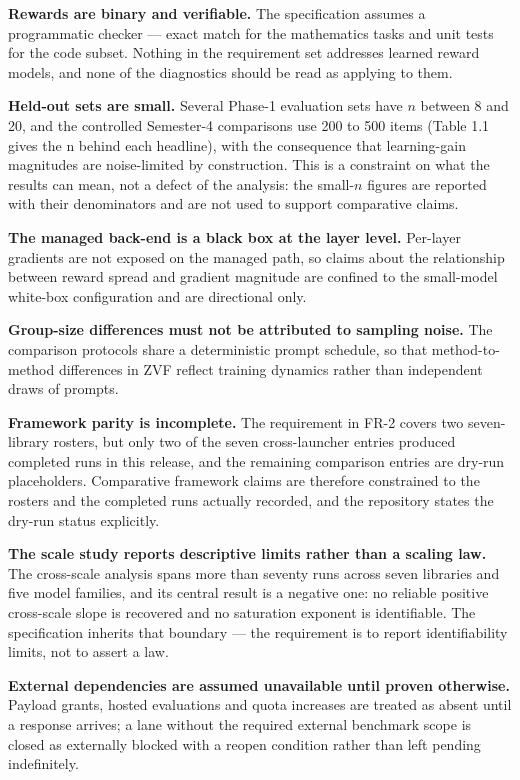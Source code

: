 \documentclass[12pt,a4paper]{report}
\begin{document}
\textbf{Rewards are binary and verifiable.} The specification assumes a
programmatic checker --- exact match for the mathematics tasks and unit
tests for the code subset. Nothing in the requirement set addresses
learned reward models, and none of the diagnostics should be read as
applying to them.

\textbf{Held-out sets are small.} Several Phase-1 evaluation sets have
\(n\) between 8 and 20, and the controlled Semester-4 comparisons use
200 to 500 items (Table 1.1 gives the n behind each headline), with the
consequence that learning-gain magnitudes are noise-limited by
construction. This is a constraint on what the results can mean, not a
defect of the analysis: the small-\(n\) figures are reported with their
denominators and are not used to support comparative claims.

\textbf{The managed back-end is a black box at the layer level.}
Per-layer gradients are not exposed on the managed path, so claims about
the relationship between reward spread and gradient magnitude are
confined to the small-model white-box configuration and are directional
only.

\textbf{Group-size differences must not be attributed to sampling
noise.} The comparison protocols share a deterministic prompt schedule,
so that method-to-method differences in ZVF reflect training dynamics
rather than independent draws of prompts.

\textbf{Framework parity is incomplete.} The requirement in FR-2 covers
two seven-library rosters, but only two of the seven cross-launcher
entries produced completed runs in this release, and the remaining
comparison entries are dry-run placeholders. Comparative framework
claims are therefore constrained to the rosters and the completed runs
actually recorded, and the repository states the dry-run status
explicitly.

\textbf{The scale study reports descriptive limits rather than a scaling
law.} The cross-scale analysis spans more than seventy runs across seven
libraries and five model families, and its central result is a negative
one: no reliable positive cross-scale slope is recovered and no
saturation exponent is identifiable. The specification inherits that
boundary --- the requirement is to report identifiability limits, not to
assert a law.

\textbf{External dependencies are assumed unavailable until proven
otherwise.} Payload grants, hosted evaluations and quota increases are
treated as absent until a response arrives; a lane without the required
external benchmark scope is closed as externally blocked with a reopen
condition rather than left pending indefinitely.
\end{document}
